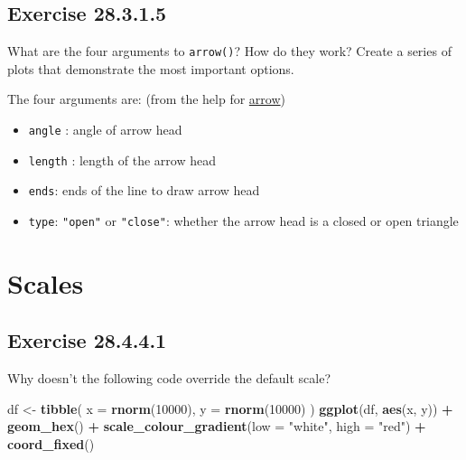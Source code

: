\documentclass[]{book}
\newenvironment{Shaded}{\begin{snugshade}}{\end{snugshade}}
\newcommand{\DataTypeTok}[1]{\textcolor[rgb]{0.13,0.29,0.53}{#1}}
\newcommand{\DecValTok}[1]{\textcolor[rgb]{0.00,0.00,0.81}{#1}}
\newcommand{\KeywordTok}[1]{\textcolor[rgb]{0.13,0.29,0.53}{\textbf{#1}}}
\newcommand{\NormalTok}[1]{#1}
\newcommand{\OperatorTok}[1]{\textcolor[rgb]{0.81,0.36,0.00}{\textbf{#1}}}
\newcommand{\StringTok}[1]{\textcolor[rgb]{0.31,0.60,0.02}{#1}}
\providecommand{\tightlist}{%
  \setlength{\itemsep}{0pt}\setlength{\parskip}{0pt}}
\theoremstyle{plain}
\theoremstyle{remark}
\begin{document}
\hypertarget{exercise-28.3.1.5}{%
\subsection*{\texorpdfstring{Exercise {28.3.1.5}}{Exercise 28.3.1.5}}\label{exercise-28.3.1.5}}

What are the four arguments to \texttt{arrow()}? How do they work?
Create a series of plots that demonstrate the most important options.

The four arguments are: (from the help for \href{https://www.rdocumentation.org/packages/grid/versions/3.3.2/topics/arrow}{arrow})

\begin{itemize}
\tightlist
\item
  \texttt{angle} : angle of arrow head
\item
  \texttt{length} : length of the arrow head
\item
  \texttt{ends}: ends of the line to draw arrow head
\item
  \texttt{type}: \texttt{"open"} or \texttt{"close"}: whether the arrow head is a closed or open triangle
\end{itemize}

\hypertarget{scales}{%
\section{Scales}\label{scales}}

\hypertarget{exercise-28.4.4.1}{%
\subsection*{\texorpdfstring{Exercise {28.4.4.1}}{Exercise 28.4.4.1}}\label{exercise-28.4.4.1}}

Why doesn't the following code override the default scale?

\begin{Shaded}
\begin{Highlighting}[]
\NormalTok{df <-}\StringTok{ }\KeywordTok{tibble}\NormalTok{(}
  \DataTypeTok{x =} \KeywordTok{rnorm}\NormalTok{(}\DecValTok{10000}\NormalTok{),}
  \DataTypeTok{y =} \KeywordTok{rnorm}\NormalTok{(}\DecValTok{10000}\NormalTok{)}
\NormalTok{)}
\KeywordTok{ggplot}\NormalTok{(df, }\KeywordTok{aes}\NormalTok{(x, y)) }\OperatorTok{+}
\StringTok{  }\KeywordTok{geom_hex}\NormalTok{() }\OperatorTok{+}
\StringTok{  }\KeywordTok{scale_colour_gradient}\NormalTok{(}\DataTypeTok{low =} \StringTok{"white"}\NormalTok{, }\DataTypeTok{high =} \StringTok{"red"}\NormalTok{) }\OperatorTok{+}
\StringTok{  }\KeywordTok{coord_fixed}\NormalTok{()}
\end{Highlighting}
\end{Shaded}
\end{document}

